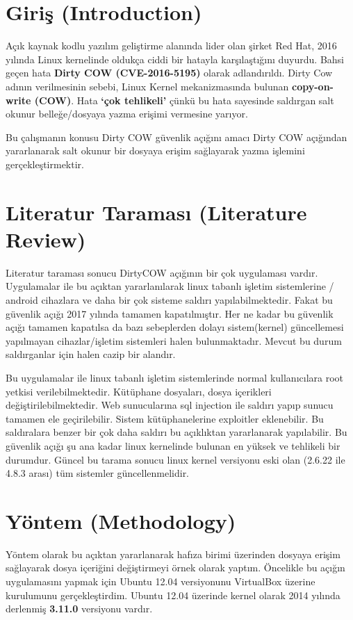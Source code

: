 \documentclass[conference, 12pt, a4paper]{IEEEtran}
\begin{document}
\begin{sloppypar}
\section{Giriş (Introduction)}
    Açık kaynak kodlu yazılım geliştirme alanında lider olan şirket Red Hat, 2016 yılında Linux kernelinde oldukça ciddi bir hatayla karşılaştığını duyurdu. Bahsi geçen hata \textbf{Dirty COW (CVE-2016-5195)} olarak adlandırıldı. Dirty Cow adının verilmesinin sebebi, Linux Kernel mekanizmasında bulunan \textbf{copy-on-write (COW)}. Hata \textbf{‘çok tehlikeli’} çünkü bu hata sayesinde saldırgan salt okunur belleğe/dosyaya yazma erişimi vermesine yarıyor.

    Bu çalışmanın konusu Dirty COW güvenlik açığını amacı Dirty COW açığından yararlanarak salt okunur bir dosyaya erişim sağlayarak yazma işlemini gerçekleştirmektir. 

\section{Literatur Taraması (Literature Review)}
    Literatur taraması sonucu DirtyCOW açığının bir çok uygulaması vardır. Uygulamalar ile bu açıktan yararlanılarak linux tabanlı işletim sistemlerine / android cihazlara ve daha bir çok sisteme saldırı yapılabilmektedir. Fakat bu güvenlik açığı 2017 yılında tamamen kapatılmıştır. Her ne kadar bu güvenlik açığı tamamen kapatılsa da bazı sebeplerden dolayı sistem(kernel) güncellemesi yapılmayan cihazlar/işletim sistemleri halen bulunmaktadır. Mevcut bu durum saldırganlar için halen cazip bir alandır.

    Bu uygulamalar ile linux tabanlı işletim sistemlerinde normal kullanıcılara root yetkisi verilebilmektedir. Kütüphane dosyaları, dosya içerikleri değiştirilebilmektedir. Web sunucularına sql injection ile saldırı yapıp sunucu tamamen ele geçirilebilir. Sistem kütüphanelerine exploitler eklenebilir. Bu saldıralara benzer bir çok daha saldırı bu açıklıktan yararlanarak yapılabilir. Bu güvenlik açığı şu ana kadar linux kernelinde bulunan en yüksek ve tehlikeli bir durumdur. Güncel bu tarama sonucu linux kernel versiyonu eski olan (2.6.22 ile 4.8.3 arası) tüm sistemler güncellenmelidir. 

\section{Yöntem (Methodology)}
    Yöntem olarak bu açıktan yararlanarak hafıza birimi üzerinden dosyaya erişim sağlayarak dosya içeriğini değiştirmeyi örnek olarak yaptım.
    Öncelikle bu açığın uygulamasını yapmak için Ubuntu 12.04 versiyonunu VirtualBox üzerine kurulumunu gerçekleştirdim. Ubuntu 12.04 üzerinde kernel olarak 2014 yılında derlenmiş \textbf{3.11.0} versiyonu vardır. 
     

\end{sloppypar}
\end{document}
